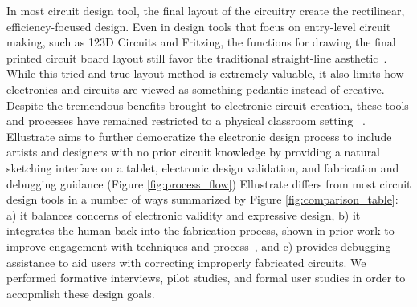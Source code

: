 \documentclass{sigchi}
\begin{document}
In most circuit design tool, the final layout of the circuitry create the rectilinear, efficiency-focused design.
Even in design tools that focus on entry-level circuit making, such as 123D Circuits and Fritzing, the functions for drawing the final printed circuit board layout still favor the traditional straight-line aesthetic~\cite{_autodesk123d_????}.
While this tried-and-true layout method is extremely valuable, it also limits how electronics and circuits are viewed as something pedantic instead of creative. Despite the tremendous benefits brought to electronic circuit creation, these tools and processes have remained restricted to a physical classroom setting ~\cite{qi_stickers_2015,qi_sketching_2014}. Ellustrate aims to further democratize the electronic design process to include artists and designers with no prior circuit knowledge by providing a natural sketching interface on a tablet, electronic design validation, and fabrication and debugging guidance (Figure \ref{fig:process_flow})
Ellustrate differs from most circuit design tools in a number of ways summarized by Figure \ref{fig:comparison_table}: a) it balances concerns of electronic validity and expressive design, b) it integrates the human back into the fabrication process, shown in prior work to improve engagement with techniques and process~\cite{anonmyzied_proxy}, and c) provides debugging assistance to aid users with correcting improperly fabricated circuits. We performed formative interviews, pilot studies, and formal user studies in order to accopmlish these design goals. 

\end{document}
